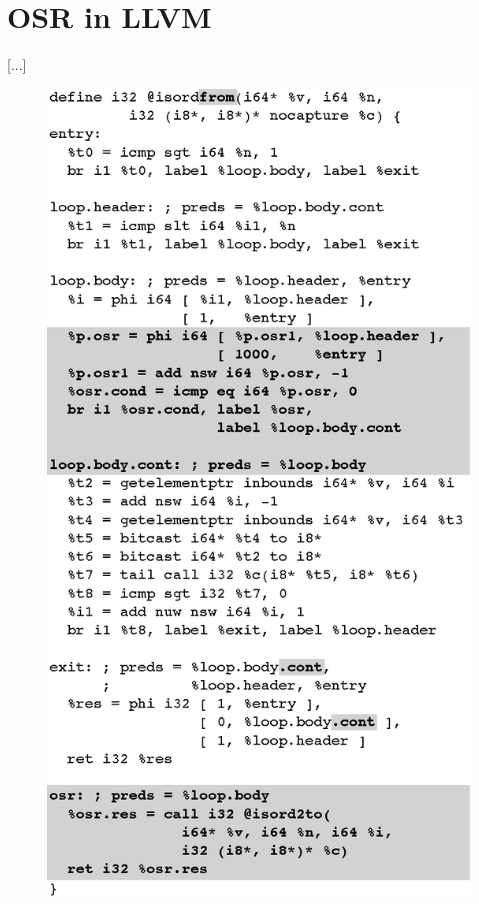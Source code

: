 \section{OSR in LLVM}
\label{se:osr-llvm}

[...]

\ifdefined\noauthorea
\begin{figure}[t]
\begin{center}
\includegraphics[width=0.9\columnwidth]{figures/isordfrom/isordfrom.eps}
\caption{\protect}
\end{center}
\end{figure}
\fi

